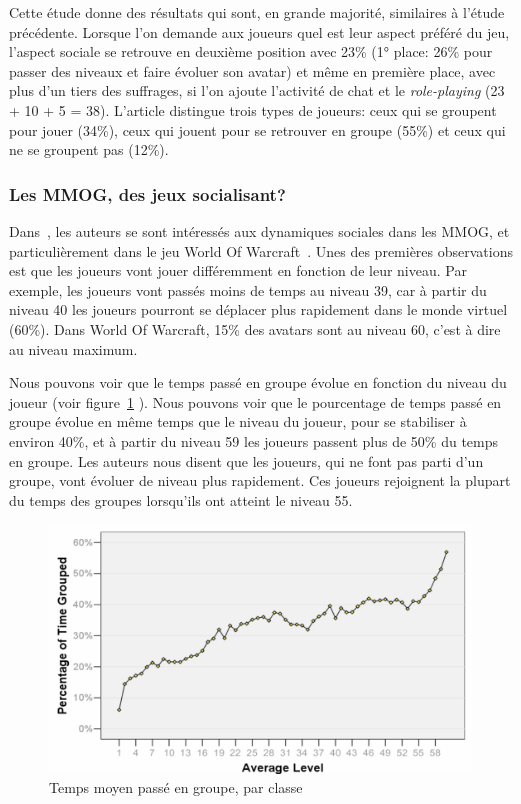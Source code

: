 Cette étude donne des résultats qui sont, en grande majorité, similaires à l'étude précédente. Lorsque l'on demande aux joueurs quel est leur aspect préféré du jeu, l'aspect sociale se retrouve en deuxième position avec 23\% (1° place: 26\% pour passer des niveaux et faire évoluer son avatar) et même en première place, avec plus d'un tiers des suffrages, si l'on ajoute l'activité de chat et le \textit{role-playing} (23 + 10 + 5 = 38). L'article distingue trois types de joueurs: ceux qui se groupent pour jouer (34\%), ceux qui jouent pour se retrouver en groupe (55\%) et ceux qui ne se groupent pas (12\%).



\subsubsection{Les MMOG, des jeux socialisant?}
\par Dans~\cite{1124834}, les auteurs se sont intéressés aux dynamiques sociales dans les MMOG, et particulièrement dans le jeu World Of Warcraft~\cite{wow}. Unes des premières observations est que les joueurs vont jouer différemment en fonction de leur niveau. Par exemple, les joueurs vont passés moins de temps au niveau 39, car à partir du niveau 40 les joueurs pourront se déplacer plus rapidement dans le monde virtuel (60\%). Dans World Of Warcraft, 15\% des avatars sont au niveau 60, c'est à dire au niveau maximum.

\par Nous pouvons voir que le temps passé en groupe évolue en fonction du niveau du joueur (voir figure~\ref{timespentgroup} ). Nous pouvons voir que le pourcentage de temps passé en groupe évolue en même temps que le niveau du joueur, pour se stabiliser à environ 40\%, et à partir du niveau 59 les joueurs passent plus de 50\% du temps en groupe. Les auteurs nous disent que les joueurs, qui ne font pas parti d'un groupe, vont évoluer de niveau plus rapidement. Ces joueurs rejoignent la plupart du temps des groupes lorsqu'ils ont atteint le niveau 55. 
	\begin{figure}[!h]
        \centering
        \includegraphics[scale=0.95]{./Ressources/Images/timespentgroup.png}
        \caption{Temps moyen passé en groupe, par classe}
        \label{timespentgroup}
        \end{figure}

